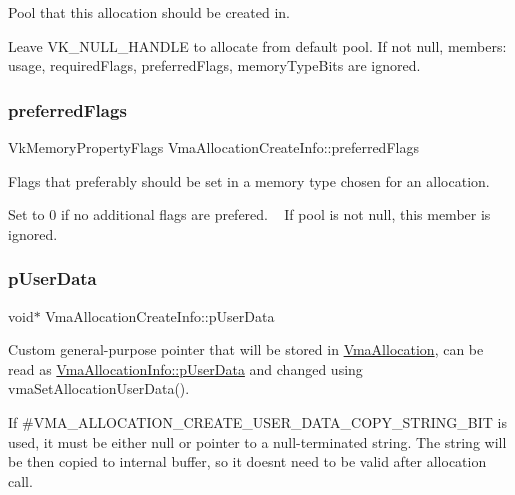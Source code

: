 Pool that this allocation should be created in. 

Leave {\ttfamily V\+K\+\_\+\+N\+U\+L\+L\+\_\+\+H\+A\+N\+D\+LE} to allocate from default pool. If not null, members\+: {\ttfamily usage}, {\ttfamily required\+Flags}, {\ttfamily preferred\+Flags}, {\ttfamily memory\+Type\+Bits} are ignored. \mbox{\label{structVmaAllocationCreateInfo_a7fe8d81a1ad10b2a2faacacee5b15d6d}} 
\subsubsection{\texorpdfstring{preferred\+Flags}{preferredFlags}}
{\footnotesize\ttfamily Vk\+Memory\+Property\+Flags Vma\+Allocation\+Create\+Info\+::preferred\+Flags}



Flags that preferably should be set in a memory type chosen for an allocation. 

Set to 0 if no additional flags are prefered. ~\newline
If {\ttfamily pool} is not null, this member is ignored. \mbox{\label{structVmaAllocationCreateInfo_a8259e85c272683434f4abb4ddddffe19}} 
\subsubsection{\texorpdfstring{p\+User\+Data}{pUserData}}
{\footnotesize\ttfamily void$\ast$ Vma\+Allocation\+Create\+Info\+::p\+User\+Data}



Custom general-\/purpose pointer that will be stored in \hyperlink{structVmaAllocation}{Vma\+Allocation}, can be read as \hyperlink{structVmaAllocationInfo_adc507656149c04de7ed95d0042ba2a13}{Vma\+Allocation\+Info\+::p\+User\+Data} and changed using vma\+Set\+Allocation\+User\+Data(). 

If \#\+V\+M\+A\+\_\+\+A\+L\+L\+O\+C\+A\+T\+I\+O\+N\+\_\+\+C\+R\+E\+A\+T\+E\+\_\+\+U\+S\+E\+R\+\_\+\+D\+A\+T\+A\+\_\+\+C\+O\+P\+Y\+\_\+\+S\+T\+R\+I\+N\+G\+\_\+\+B\+IT is used, it must be either null or pointer to a null-\/terminated string. The string will be then copied to internal buffer, so it doesn\textquotesingle{}t need to be valid after allocation call. \mbox{\label{structVmaAllocationCreateInfo_a9166390303ff42d783305bc31c2b6b90}} 
